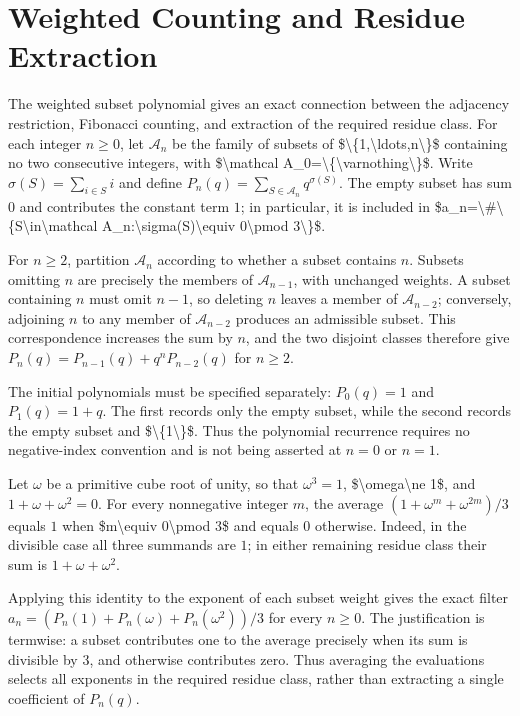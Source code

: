 \documentclass[11pt]{article}
\begin{document}
\section{Weighted Counting and Residue Extraction}
The weighted subset polynomial gives an exact connection between the adjacency restriction, Fibonacci counting, and extraction of the required residue class. For each integer $n\geq 0$, let $\mathcal A_n$ be the family of subsets of \$\textbackslash{}\{1,\textbackslash{}ldots,n\textbackslash{}\}\$ containing no two consecutive integers, with \$\textbackslash{}mathcal A\_0=\textbackslash{}\{\textbackslash{}varnothing\textbackslash{}\}\$. Write $\sigma(S)=\sum_{i\in S}i$ and define $P_n(q)=\sum_{S\in\mathcal A_n}q^{\sigma(S)}$. The empty subset has sum $0$ and contributes the constant term $1$; in particular, it is included in \$a\_n=\textbackslash{}\#\textbackslash{}\{S\textbackslash{}in\textbackslash{}mathcal A\_n:\textbackslash{}sigma(S)\textbackslash{}equiv 0\textbackslash{}pmod 3\textbackslash{}\}\$.

For $n\geq 2$, partition $\mathcal A_n$ according to whether a subset contains $n$. Subsets omitting $n$ are precisely the members of $\mathcal A_{n-1}$, with unchanged weights. A subset containing $n$ must omit $n-1$, so deleting $n$ leaves a member of $\mathcal A_{n-2}$; conversely, adjoining $n$ to any member of $\mathcal A_{n-2}$ produces an admissible subset. This correspondence increases the sum by $n$, and the two disjoint classes therefore give $P_n(q)=P_{n-1}(q)+q^nP_{n-2}(q)$ for $n\geq 2$.

The initial polynomials must be specified separately: $P_0(q)=1$ and $P_1(q)=1+q$. The first records only the empty subset, while the second records the empty subset and \$\textbackslash{}\{1\textbackslash{}\}\$. Thus the polynomial recurrence requires no negative-index convention and is not being asserted at $n=0$ or $n=1$.

Let $\omega$ be a primitive cube root of unity, so that $\omega^3=1$, \$\textbackslash{}omega\textbackslash{}ne 1\$, and $1+\omega+\omega^2=0$. For every nonnegative integer $m$, the average $(1+\omega^m+\omega^{2m})/3$ equals $1$ when \$m\textbackslash{}equiv 0\textbackslash{}pmod 3\$ and equals $0$ otherwise. Indeed, in the divisible case all three summands are $1$; in either remaining residue class their sum is $1+\omega+\omega^2$.

Applying this identity to the exponent of each subset weight gives the exact filter $a_n=(P_n(1)+P_n(\omega)+P_n(\omega^2))/3$ for every $n\geq 0$. The justification is termwise: a subset contributes one to the average precisely when its sum is divisible by $3$, and otherwise contributes zero. Thus averaging the evaluations selects all exponents in the required residue class, rather than extracting a single coefficient of $P_n(q)$.
\end{document}
